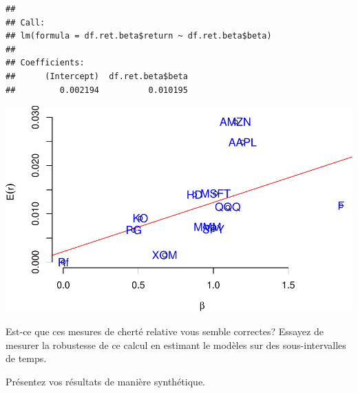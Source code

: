 \documentclass[
]{article}
\begin{document}
\begin{table}[H]
\centering
{}
\end{table}

\begin{verbatim}
## 
## Call:
## lm(formula = df.ret.beta$return ~ df.ret.beta$beta)
## 
## Coefficients:
##      (Intercept)  df.ret.beta$beta  
##         0.002194          0.010195
\end{verbatim}

\includegraphics{TP-3_files/figure-latex/unnamed-chunk-8-1.pdf}

Est-ce que ces mesures de cherté relative vous semble correctes? Essayez
de mesurer la robustesse de ce calcul en estimant le modèles sur des
sous-intervalles de temps.

Présentez vos résultats de manière synthétique.
\end{document}
